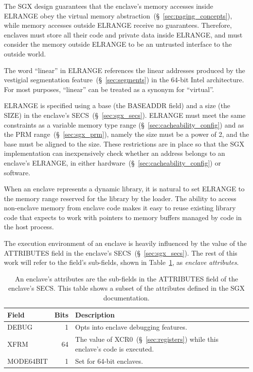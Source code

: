 The SGX design guarantees that the enclave's memory accesses inside ELRANGE
obey the virtual memory abstraction~(\S~\ref{sec:paging_concepts}), while
memory accesses outside ELRANGE receive no guarantees. Therefore, enclaves must
store all their code and private data inside ELRANGE, and must consider the
memory outside ELRANGE to be an untrusted interface to the outside world.

The word ``linear'' in ELRANGE references the linear addresses produced by the
vestigial segmentation feature~(\S~\ref{sec:segments}) in the 64-bit Intel
architecture. For most purposes, ``linear'' can be treated as a synonym for
``virtual''.

ELRANGE is specified using a base (the BASEADDR field) and a size (the SIZE)
in the enclave's SECS~(\S~\ref{sec:sgx_secs}). ELRANGE must meet the same
constraints as a variable memory type range (\S~\ref{sec:cacheability_config})
and as the PRM range~(\S~\ref{sec:sgx_prm}), namely the size must be a power of
2, and the base must be aligned to the size. These restrictions are in place so
that the SGX implementation can inexpensively check whether an address belongs
to an enclave's ELRANGE, in either hardware~(\S~\ref{sec:cacheability_config})
or software.

When an enclave represents a dynamic library, it is natural to set ELRANGE to
the memory range reserved for the library by the loader. The ability to access
non-enclave memory from enclave code makes it easy to reuse existing library
code that expects to work with pointers to memory buffers managed by code in the
host process.


\label{sec:sgx_secs_attributes}

The execution environment of an enclave is heavily influenced by the value of
the ATTRIBUTES field in the enclave's SECS~(\S~\ref{sec:sgx_secs}). The rest of
this work will refer to the field's sub-fields, shown in
Table~\ref{fig:sgx_secs_attributes}, as \textit{enclave attributes}.


\begin{table}[hbt]
  \centering
  \begin{tabularx}{\columnwidth}{| l | r | X |}
  \hline
  \textbf{Field} & \textbf{Bits} & \textbf{Description} \\
  \hline
  DEBUG & 1 & Opts into enclave debugging features. \\
  \hline
  XFRM & 64 & The value of XCR0~(\S~\ref{sec:registers}) while this enclave's
              code is executed. \\
  \hline
  MODE64BIT & 1 & Set for 64-bit enclaves. \\
  \hline
  \end{tabularx}
  \caption{
    An enclave's attributes are the sub-fields in the ATTRIBUTES field of the
    enclave's SECS. This table shows a subset of the attributes defined in the
    SGX documentation.
  }
  \label{fig:sgx_secs_attributes}
\end{table}

